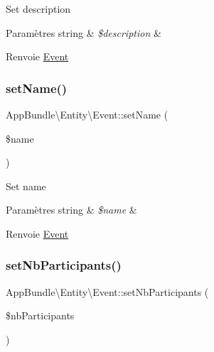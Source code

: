 Set description


\begin{DoxyParams}[1]{Paramètres}
string & {\em \$description} & \\
\hline
\end{DoxyParams}
\begin{DoxyReturn}{Renvoie}
\hyperlink{classAppBundle_1_1Entity_1_1Event}{Event} 
\end{DoxyReturn}
\mbox{\label{classAppBundle_1_1Entity_1_1Event_a834c71ca866cd9a1e88e5fcd105ef187}} 
\subsubsection{\texorpdfstring{set\+Name()}{setName()}}
{\footnotesize\ttfamily App\+Bundle\textbackslash{}\+Entity\textbackslash{}\+Event\+::set\+Name (\begin{DoxyParamCaption}\item[{}]{\$name }\end{DoxyParamCaption})}

Set name


\begin{DoxyParams}[1]{Paramètres}
string & {\em \$name} & \\
\hline
\end{DoxyParams}
\begin{DoxyReturn}{Renvoie}
\hyperlink{classAppBundle_1_1Entity_1_1Event}{Event} 
\end{DoxyReturn}
\mbox{\label{classAppBundle_1_1Entity_1_1Event_a3d39550bcf4a114ebac3a021745d281f}} 
\subsubsection{\texorpdfstring{set\+Nb\+Participants()}{setNbParticipants()}}
{\footnotesize\ttfamily App\+Bundle\textbackslash{}\+Entity\textbackslash{}\+Event\+::set\+Nb\+Participants (\begin{DoxyParamCaption}\item[{}]{\$nb\+Participants }\end{DoxyParamCaption})}

